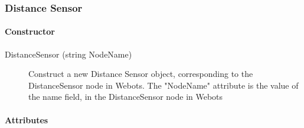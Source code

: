 \subsubsection{Distance Sensor}
\label{webots.uobjects.robotdevices.distancesensor}%

\paragraph{Constructor}
\label{webots.uobjects.robotdevices.distancesensor.constructor}%

\noindent
\begin{description}
\item[{DistanceSensor (string NodeName)}]         Construct a new Distance Sensor object, corresponding to the DistanceSensor node in
          Webots. The "NodeName" attribute is the value
          of the name field, in the DistanceSensor node in Webots

\end{description}

\paragraph{Attributes}
\label{webots.uobjects.robotdevices.distancesensor.attributes}%

